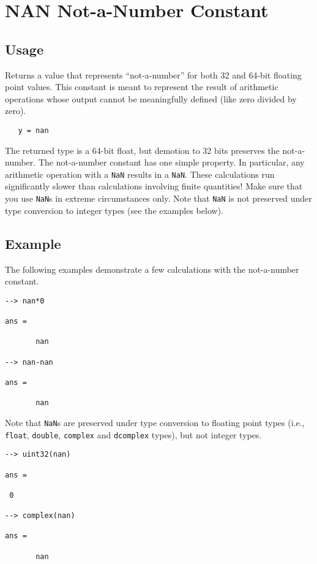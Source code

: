 \section{NAN Not-a-Number Constant}

\subsection{Usage}

Returns a value that represents ``not-a-number'' for both 32 and 64-bit 
floating point values.  This constant is meant to represent the result of
arithmetic operations whose output cannot be meaningfully defined (like 
zero divided by zero).
\begin{verbatim}
   y = nan
\end{verbatim}
The returned type is a 64-bit float, but demotion to 32 bits preserves the not-a-number.  The not-a-number constant has one simple property.  In particular, any arithmetic operation with a \verb|NaN| results in a \verb|NaN|. These calculations run significantly slower than calculations involving finite quantities!  Make sure that you use \verb|NaN|s in extreme circumstances only.  Note that \verb|NaN| is not preserved under type conversion to integer types (see the examples below).
\subsection{Example}

The following examples demonstrate a few calculations with the not-a-number constant.
\begin{verbatim}
--> nan*0

ans = 

       nan 

--> nan-nan

ans = 

       nan 
\end{verbatim}
Note that \verb|NaN|s are preserved under type conversion to floating point types (i.e., \verb|float|, \verb|double|, \verb|complex| and \verb|dcomplex| types), but not integer  types.
\begin{verbatim}
--> uint32(nan)

ans = 

 0 

--> complex(nan)

ans = 

       nan 
\end{verbatim}
